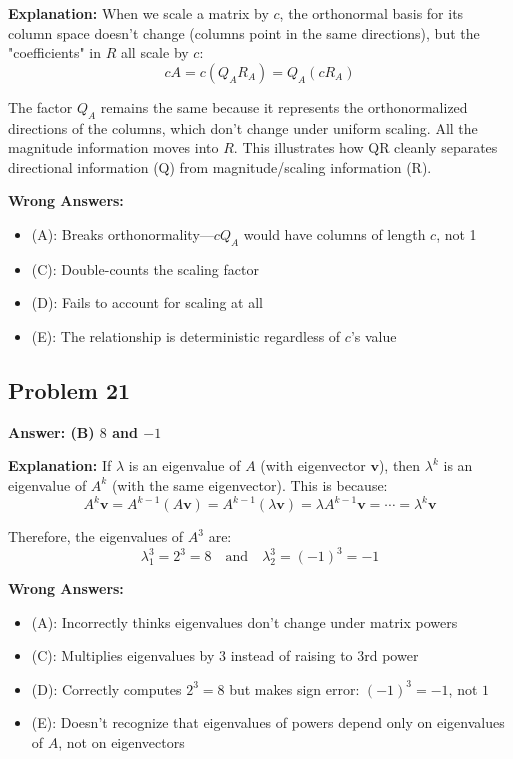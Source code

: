\documentclass[12pt]{amsart}
\newcommand{\correct}[1]{{\color{correctgreen}\textbf{#1}}}
\begin{document}
{\textbf{Explanation:} When we scale a matrix by $c$, the orthonormal basis for its column space doesn't change (columns point in the same directions), but the "coefficients" in $R$ all scale by $c$:
$$cA = c(Q_AR_A) = Q_A(cR_A)$$

The factor $Q_A$ remains the same because it represents the orthonormalized directions of the columns, which don't change under uniform scaling. All the magnitude information moves into $R$. This illustrates how QR cleanly separates directional information (Q) from magnitude/scaling information (R).

\textbf{Wrong Answers:}
\begin{itemize}
\item (A): Breaks orthonormality—$cQ_A$ would have columns of length $c$, not 1
\item (C): Double-counts the scaling factor
\item (D): Fails to account for scaling at all
\item (E): The relationship is deterministic regardless of $c$'s value
\end{itemize}

\subsection*{Problem 21}
\correct{Answer: (B) $8$ and $-1$}

\textbf{Explanation:} If $\lambda$ is an eigenvalue of $A$ (with eigenvector $\mathbf{v}$), then $\lambda^k$ is an eigenvalue of $A^k$ (with the same eigenvector). This is because:
$$A^k\mathbf{v} = A^{k-1}(A\mathbf{v}) = A^{k-1}(\lambda\mathbf{v}) = \lambda A^{k-1}\mathbf{v} = \cdots = \lambda^k\mathbf{v}$$

Therefore, the eigenvalues of $A^3$ are:
$$\lambda_1^3 = 2^3 = 8 \quad \text{and} \quad \lambda_2^3 = (-1)^3 = -1$$

\textbf{Wrong Answers:}
\begin{itemize}
\item (A): Incorrectly thinks eigenvalues don't change under matrix powers
\item (C): Multiplies eigenvalues by 3 instead of raising to 3rd power
\item (D): Correctly computes $2^3 = 8$ but makes sign error: $(-1)^3 = -1$, not $1$
\item (E): Doesn't recognize that eigenvalues of powers depend only on eigenvalues of $A$, not on eigenvectors
\end{itemize}

}
\end{document}
